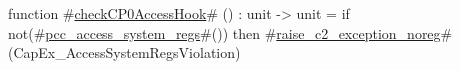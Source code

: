 function #\hyperref[sailMIPSzcheckCP0AccessHook]{checkCP0AccessHook}# () : unit -> unit = {
  if not(#\hyperref[sailMIPSzpcczyaccesszysystemzyregs]{pcc\_access\_system\_regs}#()) then
    #\hyperref[sailMIPSzraisezyc2zyexceptionzynoreg]{raise\_c2\_exception\_noreg}#(CapEx_AccessSystemRegsViolation)
}
